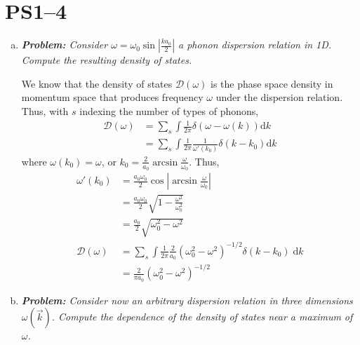 \documentclass[10pt]{article}
\newcommand{\abs}[1]{\left|#1\right|}
\begin{document}
\pagestyle{fancy}
\cfoot{\thepage/\pageref{LastPage}}

\section{PS1--4}

\begin{enumerate}[(a)]
    \item \emph{\textbf{Problem:} Consider
        $\omega = \omega_0\sin\abs{\frac{ka_0}{2}}$
        a phonon dispersion relation in 1D. Compute the resulting density of
        states.}

        We know that the density of states $\mathcal{D}(\omega)$ is the phase
        space density in momentum space that produces frequency $\omega$ under
        the dispersion relation. Thus, with $s$ indexing the number of types of
        phonons,
        \begin{align}
            \mathcal{D}(\omega) &= \sum_s
                    \int \frac{1}{2\pi}\delta(\omega - \omega(k))\mathrm{d}k\\
                &= \sum_s
                    \int \frac{1}{2\pi} \frac{1}{\omega'(k_0)}\delta(k - k_0)
                    \mathrm{d}k
        \end{align}
        where $\omega(k_0) = \omega$, or $k_0 = \frac{2}{a_0}
        \arcsin\frac{\omega}{\omega_0}$. Thus,
        \begin{align}
            \omega'(k_0) &=
                \frac{a_0\omega_0}{2}\cos\abs{\arcsin{\frac{\omega}{\omega_0}}}\\
                &= \frac{a_0\omega_0}{2}\sqrt{1 - \frac{\omega^2}{\omega_0^2}}\\
                &= \frac{a_0}{2}\sqrt{\omega_0^2 - \omega^2}\\
            \mathcal{D}(\omega) &= \sum_s
                \int \frac{1}{2\pi}\frac{2}{a_0}
                    \left( \omega_0^2 - \omega^2 \right)^{-1/2}
                    \delta(k - k_0)\;\mathrm{d}k\\
                &= \frac{2}{\pi a_0}\left( \omega_0^2 - \omega^2 \right)^{-1/2}
        \end{align}

    \item \emph{\textbf{Problem:} Consider now an arbitrary dispersion relation
        in three dimensions $\omega(\vec{k})$. Compute the dependence of the
        density of states near a maximum of $\omega$.}


\end{enumerate}
\end{document}
